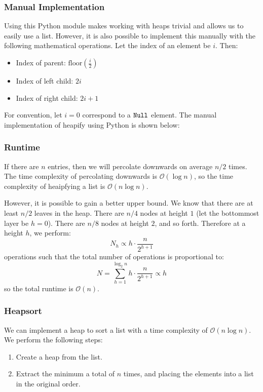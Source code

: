 \documentclass{article}
\newcommand{\floor}[1]{\mathrm{floor}\left(#1\right)}
\begin{document}
    \subsubsection{Manual Implementation}
    Using this Python module makes working with heaps trivial and allows us to easily use a list. However, it is also possible to implement this manually with the following mathematical operations. Let the index of an element be $i$. Then:
    \begin{itemize}
        \item Index of parent: $\floor{\frac{i}{2}}$
        \item Index of left child: $2i$
        \item Index of right child: $2i+1$
    \end{itemize}
    For convention, let $i=0$ correspond to a $\verb#Null#$ element. 
    The manual implementation of heapify using Python is shown below:
    \subsubsection{Runtime}
    If there are $n$ entries, then we will percolate downwards on average $n/2$ times. The time complexity of percolating downwards is $\mathcal{O}(\log n)$, so the time complexity of heaipfying a list is $\mathcal{O}(n\log n)$.

    However, it is possible to gain a better upper bound. We know that there are at least $n/2$ leaves in the heap. There are $n/4$ nodes at height $1$ (let the bottommost layer be $h=0$). There are $n/8$ nodes at height $2$, and so forth. Therefore at a height $h$, we perform:
    \begin{equation*}
        N_h \propto h \cdot \frac{n}{2^{h+1}}
    \end{equation*}
    operations such that the total number of operations is proportional to:
    \begin{equation*}
        N = \sum_{h=1}^{\log_2{n}} h \cdot \frac{n}{2^{h+1}} \propto h
    \end{equation*}
    so the total runtime is $\mathcal{O}(n)$.
    \subsubsection{Heapsort}
    We can implement a heap to sort a list with a time complexity of $\mathcal{O}(n\log n)$. We perform the following steps:
    \begin{enumerate}
        \item Create a heap from the list.
        \item Extract the minimum a total of $n$ times, and placing the elements into a list in the original order.
    \end{enumerate}
\end{document}

